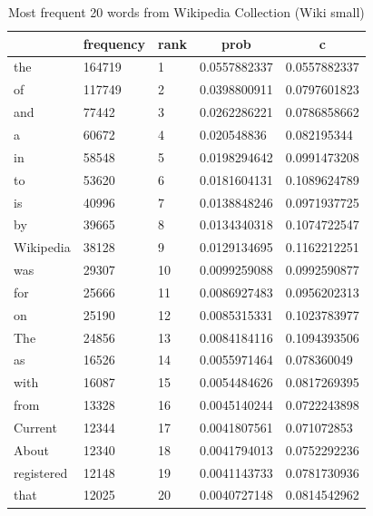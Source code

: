 \documentclass[letterpaper,11pt]{article}
\begin{document}
\begin{table}[H]
\centering
\begin{tabular}{|l|l|l|l|l|}
\hline
\rowcolor[HTML]{BBDAFF} 
\multicolumn{1}{|c|}{\cellcolor[HTML]{BBDAFF}\textbf{word}} & \multicolumn{1}{c|}{\cellcolor[HTML]{BBDAFF}\textbf{frequency}} & \multicolumn{1}{c|}{\cellcolor[HTML]{BBDAFF}\textbf{rank}} & \multicolumn{1}{c|}{\cellcolor[HTML]{BBDAFF}\textbf{prob}} & \multicolumn{1}{c|}{\cellcolor[HTML]{BBDAFF}\textbf{c}} \\ \hline
the & 164719 & 1 & 0.0557882337 & 0.0557882337 \\ \hline
of & 117749 & 2 & 0.0398800911 & 0.0797601823 \\ \hline
and & 77442 & 3 & 0.0262286221 & 0.0786858662 \\ \hline
a & 60672 & 4 & 0.020548836 & 0.082195344 \\ \hline
in & 58548 & 5 & 0.0198294642 & 0.0991473208 \\ \hline
to & 53620 & 6 & 0.0181604131 & 0.1089624789 \\ \hline
is & 40996 & 7 & 0.0138848246 & 0.0971937725 \\ \hline
by & 39665 & 8 & 0.0134340318 & 0.1074722547 \\ \hline
Wikipedia & 38128 & 9 & 0.0129134695 & 0.1162212251 \\ \hline
was & 29307 & 10 & 0.0099259088 & 0.0992590877 \\ \hline
for & 25666 & 11 & 0.0086927483 & 0.0956202313 \\ \hline
on & 25190 & 12 & 0.0085315331 & 0.1023783977 \\ \hline
The & 24856 & 13 & 0.0084184116 & 0.1094393506 \\ \hline
as & 16526 & 14 & 0.0055971464 & 0.078360049 \\ \hline
with & 16087 & 15 & 0.0054484626 & 0.0817269395 \\ \hline
from & 13328 & 16 & 0.0045140244 & 0.0722243898 \\ \hline
Current & 12344 & 17 & 0.0041807561 & 0.071072853 \\ \hline
About & 12340 & 18 & 0.0041794013 & 0.0752292236 \\ \hline
registered & 12148 & 19 & 0.0041143733 & 0.0781730936 \\ \hline
that & 12025 & 20 & 0.0040727148 & 0.0814542962 \\ \hline
\end{tabular}
\caption{Most frequent 20 words from Wikipedia Collection (Wiki small)}
\label{tab:highest-words}
\end{table}
\end{document}
